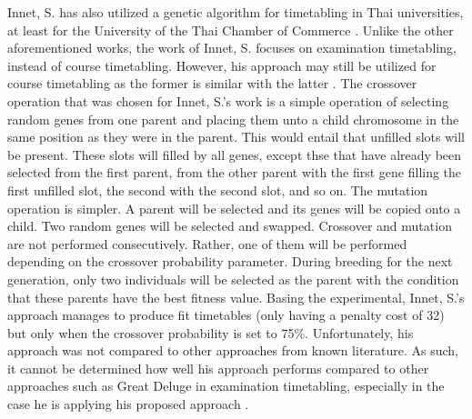 Innet, S. has also utilized a genetic algorithm for timetabling in Thai universities, at least for the University of the Thai Chamber of Commerce \cite{supachate-noval-approach-ga-thai}. Unlike the other aforementioned works, the work of Innet, S. focuses on examination timetabling, instead of course timetabling. However, his approach may still be utilized for course timetabling as the former is similar with the latter
. The crossover operation that was chosen for Innet, S.'s work is a simple operation of selecting random genes from one parent and placing them unto a child chromosome in the same position as they were in the parent. This would entail that unfilled slots will be present. These slots will filled by all genes, except thse that have already been selected from the first parent, from the other parent with the first gene filling the first unfilled slot, the second with the second slot, and so on. The mutation operation is simpler. A parent will be selected and its genes will be copied onto a child. Two random genes will be selected and swapped. Crossover and mutation are not performed consecutively. Rather, one of them will be performed depending on the crossover probability parameter. During breeding for the next generation, only two individuals will be selected as the parent with the condition that these parents have the best fitness value. Basing the experimental, Innet, S.'s approach manages to produce fit timetables (only having a penalty cost of 32) but only when the crossover probability is set to 75\%. Unfortunately, his approach was not compared to other approaches from known literature. As such, it cannot be determined how well his approach performs compared to other approaches such as Great Deluge in examination timetabling, especially in the case he is applying his proposed approach \cite{supachate-noval-approach-ga-thai}.

